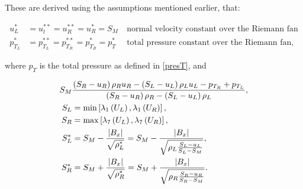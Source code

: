These are derived using the assumptions mentioned earlier, that:

\begin{align}
u^{*}_L & = u_l^{**} = u_R^{**} = u_R^{*} = S_M\ & \text{normal velocity constant over the Riemann fan}\\
p^{*}_{T_L} & = p^{**}_{T_L} = p^{**}_{T_R} = p^{*}_{T_R} = p^{*}_{T}\ & \text{total pressure constant over the Riemann fan},
\end{align}

where $p_T$ is the total pressure as defined in \cref{presT}, and

\begin{align}
S_M & \frac{\left( S_R -u_R\right)\rho_R u_R - \left( S_L - u_L\right)\rho_L u_L - p_{T_R} + p_{T_L}}{\left( S_R - u_R\right)\rho_R - \left( S_L - u_L\right)\rho_L},\\
S_L & = \mathrm{min}\left[\lambda_1\left( U_L\right), \lambda_1\left( U_R\right)\right],\\
S_R & = \mathrm{max}\left[\lambda_7\left( U_L\right), \lambda_7\left( U_R\right)\right],\\
S^{*}_L & = S_M - \frac{\left|B_x\right|}{\sqrt{\rho_L^{*}}} = S_M - \frac{\left|B_x\right|}{\sqrt{\rho_L\frac{S_L - u_L}{S_L - S_M}}},\\
S^{*}_R & = S_M + \frac{\left|B_x\right|}{\sqrt{\rho_R^{*}}} = S_M + \frac{\left|B_x\right|}{\sqrt{\rho_R\frac{S_R - u_R}{S_R - S_M}}}.
\end{align}


